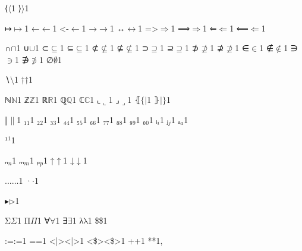{%
{⟨}{{\ensuremath{\langle}}}1
{⟩}{{\ensuremath{\rangle}}}1

{↦}{{\ensuremath{\mapsto}}}1
{←}{{\ensuremath{\leftarrow}}}1
{<-}{{\ensuremath{\leftarrow}}}1
{→}{{\ensuremath{\rightarrow}}}1
{↔}{{\ensuremath{\leftrightarrow}}}1
{=>}{{\ensuremath{\Rightarrow}}}1
{⟹}{{\ensuremath{\Longrightarrow}}}1
{⇐}{{\ensuremath{\Leftarrow}}}1
{⟸}{{\ensuremath{\Longleftarrow}}}1

{∩}{{\ensuremath{\cap}}}1
{∪}{{\ensuremath{\cup}}}1
{⊂}{{\ensuremath{\subseteq}}}1
{⊆}{{\ensuremath{\subseteq}}}1
{⊄}{{\ensuremath{\nsubseteq}}}1
{⊈}{{\ensuremath{\nsubseteq}}}1
{⊃}{{\ensuremath{\supseteq}}}1
{⊇}{{\ensuremath{\supseteq}}}1
{⊅}{{\ensuremath{\nsupseteq}}}1
{⊉}{{\ensuremath{\nsupseteq}}}1
{∈}{{\ensuremath{\in}}}1
{∉}{{\ensuremath{\notin}}}1
{∋}{{\ensuremath{\ni}}}1
{∌}{{\ensuremath{\notni}}}1
{∅}{{\ensuremath{\emptyset}}}1

{∖}{{\ensuremath{\setminus}}}1
{†}{{\ensuremath{\dag}}}1

{ℕ}{{\ensuremath{\mathbb{N}}}}1
{ℤ}{{\ensuremath{\mathbb{Z}}}}1
{ℝ}{{\ensuremath{\mathbb{R}}}}1
{ℚ}{{\ensuremath{\mathbb{Q}}}}1
{ℂ}{{\ensuremath{\mathbb{C}}}}1
{⌞}{{\ensuremath{\llcorner}}}1
{⌟}{{\ensuremath{\lrcorner}}}1
{⦃}{{\ensuremath{\{\!|}}}1
{⦄}{{\ensuremath{|\!\}}}}1

{‖}{{\ensuremath{\|}}}1
{₁}{{\ensuremath{_1}}}1
{₂}{{\ensuremath{_2}}}1
{₃}{{\ensuremath{_3}}}1
{₄}{{\ensuremath{_4}}}1
{₅}{{\ensuremath{_5}}}1
{₆}{{\ensuremath{_6}}}1
{₇}{{\ensuremath{_7}}}1
{₈}{{\ensuremath{_8}}}1
{₉}{{\ensuremath{_9}}}1
{₀}{{\ensuremath{_0}}}1
{ᵢ}{{\ensuremath{_i}}}1
{ⱼ}{{\ensuremath{_j}}}1
{ₐ}{{\ensuremath{_a}}}1

{¹}{{\ensuremath{^1}}}1

{ₙ}{{\ensuremath{_n}}}1
{ₘ}{{\ensuremath{_m}}}1
{ₚ}{{\ensuremath{_p}}}1
{↑}{{\ensuremath{\uparrow}}}1
{↓}{{\ensuremath{\downarrow}}}1

{...}{{\ensuremath{\ldots}}}1
{·}{{\ensuremath{\cdot}}}1

{▸}{{\ensuremath{\triangleright}}}1

{Σ}{{\color{symbolcolor}\ensuremath{\Sigma}}}1
{Π}{{\color{symbolcolor}\ensuremath{\Pi}}}1
{∀}{{\color{symbolcolor}\ensuremath{\forall}}}1
{∃}{{\color{symbolcolor}\ensuremath{\exists}}}1
{λ}{{\color{symbolcolor}\ensuremath{\mathrm{\lambda}}}}1
{\$}{{\color{symbolcolor}\$}}1

{:=}{{\color{symbolcolor}:=}}1
{=}{{\color{symbolcolor}=}}1
{<|>}{{\color{symbolcolor}<|>}}1
{<\$>}{{\color{symbolcolor}<\$>}}1
{+}{{\color{symbolcolor}+}}1
{*}{{\color{symbolcolor}*}}1,

}
